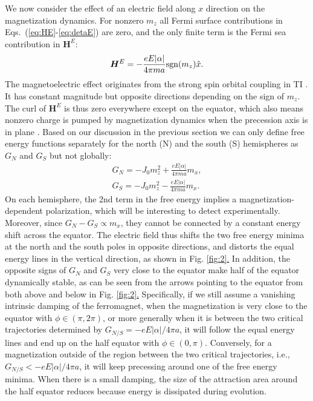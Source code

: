 \documentclass[aps,prb,twocolumn,showpacs,superscriptaddress]{revtex4-1}
\def\be{\begin{equation}} \def\ee{\end{equation}}
\def\bea{\begin{eqnarray}} \def\eea{\end{eqnarray}}
\newcommand{\subref}[2]{\ref{#1}\hyperref[#1]{#2}}
\begin{document}
We now consider the effect of an electric field along $x$ direction on the magnetization dynamics. For nonzero $m_z$ all Fermi surface contributions in Eqs.~(\ref{eq:HE}-\ref{eq:detaE}) are zero, and the only finite term is the Fermi sea contribution in $\bm{H}^E$:
\be
\bm{H}^E = -\frac{eE|\alpha|}{4\pi ma} {\rm sgn}(m_z) \hat{x}.
\ee 
The magnetoelectric effect originates from the strong spin orbital coupling in TI \cite{TI_EM_aa, TI_EM_bb,Garate:2010, TI_SOT_aa}. It has constant magnitude but opposite directions depending on the sign of $m_z$. The curl of $\bm{H}^E$ is thus zero everywhere except on the equator, which also means nonzero charge is pumped by magnetization dynamics when the precession axis is in plane \cite{Ueda:2012}. Based on our discussion in the previous section we can only define free energy functions separately for the north (N) and the south (S) hemispheres as $G_N$ and $G_S$ but not globally:
\begin{subequations}
\bea
G_{N} = -J_0m_z^2 + \frac{eE|\alpha|}{4\pi ma} m_x,  \\ 
G_{S}=  -J_0m_z^2 - \frac{eE|\alpha|}{4\pi ma} m_x.
\eea
\end{subequations}
On each hemisphere, the 2nd term in the free energy implies a magnetization-dependent polarization, which will be interesting to detect experimentally. Moreover, since $G_{N}-G_{S} \propto m_x$, they cannot be connected by a constant energy shift across the equator. The electric field thus shifts the two free energy minima at the north and the south poles in opposite directions, and distorts the equal energy lines in the vertical direction, as shown in Fig. \subref{fig:2}. In addition, the opposite signs of $G_{N}$ and $G_{S}$ very close to the equator make half of the equator dynamically stable, as can be seen from the arrows pointing to the equator from both above and below in Fig. \subref{fig:2}. Specifically, if we still assume a vanishing intrinsic damping of the ferromagnet, when the magnetization is very close to the equator with $\phi \in (\pi,2\pi)$, or more generally when it is between the two critical trajectories determined by $G_{N/S}= -{eE|\alpha|}/{4\pi a}$, it will follow the equal energy lines and end up on the half equator with $\phi \in (0,\pi)$. Conversely, for a magnetization outside of the region between the two critical trajectories, i.e., $G_{N/S} < -{eE|\alpha|}/{4\pi a}$, it will keep precessing around one of the free energy minima. When there is a small damping, the size of the attraction area around the half equator reduces because energy is dissipated during evolution. 
\end{document}
